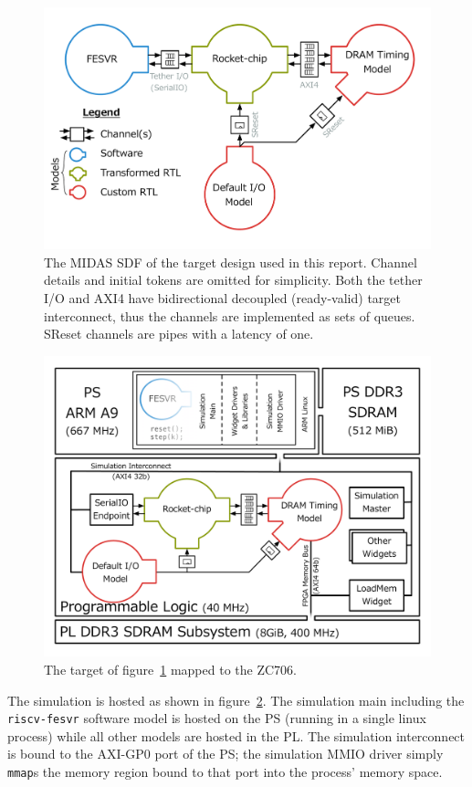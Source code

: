\begin{figure}
	\centering
	\includegraphics[width=\textwidth]{figures/masters-target.pdf}
    \caption{The MIDAS SDF of the target design used in this report. Channel
    details and initial tokens are omitted for simplicity. Both the tether I/O
    and AXI4 have bidirectional decoupled (ready-valid) target interconnect,
    thus the channels are implemented as sets of queues. SReset channels are pipes with
    a latency of one.}
	\label{fig:default-target}
\end{figure}

\begin{figure}
	\centering
	\includegraphics[width=\textwidth]{figures/hosted-masters-target.pdf}
    \caption{The target of figure~\ref{fig:default-target} mapped to the ZC706.}
	\label{fig:hosted-masters-target}
\end{figure}

The simulation is hosted as shown in figure~\ref{fig:hosted-masters-target}.
The simulation main including the \texttt{riscv-fesvr} software model is hosted
on the PS (running in a single linux process) while all other models are hosted
in the PL. The simulation interconnect is bound to the AXI-GP0 port of the PS;
the simulation MMIO driver simply \texttt{mmap}s the memory region bound to that port
into the process' memory space.

